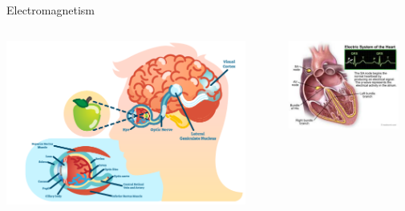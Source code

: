 %
%
%

\begin{frame}{Electromagnetism}

\begin{columns}
     \begin{column}{0.33\textwidth}
       \begin{center}
          \includegraphics[width=0.90\textwidth]{./images/misc/vision_2.png}\\
       \end{center}
      \end{column}
      \begin{column}{0.33\textwidth}
        \begin{center}
          \includegraphics[width=0.90\textwidth]{./images/misc/electrical_system_heart.jpg}\\
        \end{center}

\end{column}
\end{columns}
\end{frame}
